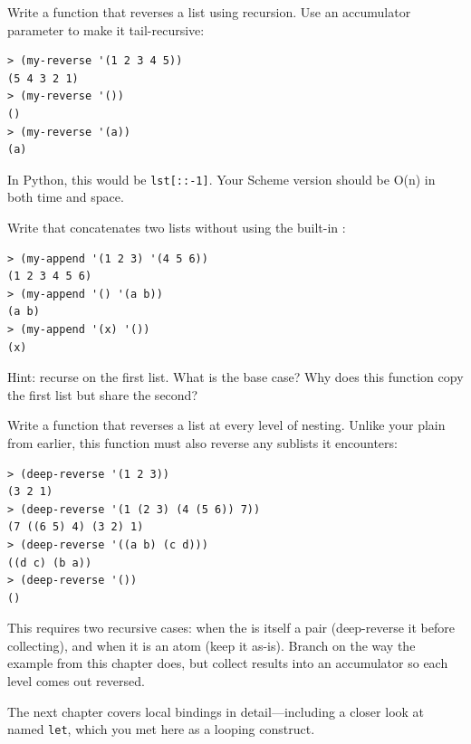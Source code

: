 \begin{exercise}
Write a function  that reverses a list using recursion. Use an accumulator parameter to make it tail-recursive:

\begin{lstlisting}[style=repl]
> (my-reverse '(1 2 3 4 5))
(5 4 3 2 1)
> (my-reverse '())
()
> (my-reverse '(a))
(a)
\end{lstlisting}

In Python, this would be \texttt{lst[::-1]}. Your Scheme version should be O(n) in both time and space.
\end{exercise}

\begin{exercise}
Write  that concatenates two lists without using the built-in :

\begin{lstlisting}[style=repl]
> (my-append '(1 2 3) '(4 5 6))
(1 2 3 4 5 6)
> (my-append '() '(a b))
(a b)
> (my-append '(x) '())
(x)
\end{lstlisting}

Hint: recurse on the first list. What is the base case? Why does this function copy the first list but share the second?
\end{exercise}

\begin{exercise}
Write a function  that reverses a list at every level of nesting. Unlike your plain  from earlier, this function must also reverse any sublists it encounters:

\begin{lstlisting}[style=repl]
> (deep-reverse '(1 2 3))
(3 2 1)
> (deep-reverse '(1 (2 3) (4 (5 6)) 7))
(7 ((6 5) 4) (3 2) 1)
> (deep-reverse '((a b) (c d)))
((d c) (b a))
> (deep-reverse '())
()
\end{lstlisting}

This requires two recursive cases: when the  is itself a pair (deep-reverse it before collecting), and when it is an atom (keep it as-is). Branch on  the way the  example from this chapter does, but collect results into an accumulator so each level comes out reversed.
\end{exercise}

The next chapter covers local bindings in detail---including a closer look at named \texttt{let}, which you met here as a looping construct.

\chapterend
